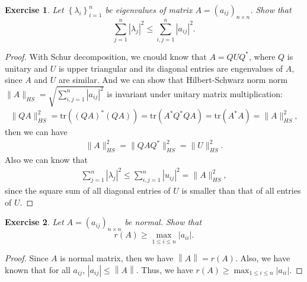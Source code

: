 \documentclass[10pt]{book}
\newtheorem{exercise}{Exercise}[section]
\theoremstyle{definition}
\numberwithin{equation}{chapter}
\begin{document}
\medskip

\begin{exercise}
Let $\left\{  \lambda_{i}\right\}  _{i=1}^{n}$ be eigenvalues of matrix
$A=\left(  a_{ij}\right)  _{n\times n}$. Show that%
$$
\sum_{j=1}^{n}\left\vert \lambda_{j}\right\vert ^{2}\leq\sum_{i,j=1}%
^{n}\left\vert a_{ij}\right\vert ^{2}.
$$
\end{exercise}
\begin{proof}
With Schur decomposition, we cnould know that $A = Q U Q^*$, where $Q$ is unitary and $U$ is upper triangular and its diagonal entries are engenvalues of $A$, since $A$ and $U$ are similar. And we can show that Hilbert-Schwarz norm norm $\|A\|_{HS} = \sqrt{\sum_{i,j=1}^{n} \left|a_{ij}\right|^2}$ is invariant under unitary matrix multiplication:
\begin{align*}
    \|QA\|_{HS}^2 = \text{tr} \left((QA)^* (QA)\right) = \text{tr} \left(A^* Q^* QA\right) = \text{tr} \left(A^* A\right) = \|A\|_{HS}^2,
\end{align*}
then we can have 
\begin{align*}
    \|A\|_{HS}^2 = \|QAQ^*\|_{HS}^2 = \|U\|_{HS}^2.
\end{align*}
Also we can know that
\begin{align*}
    \sum_{j=1}^{n}\left| \lambda_{j}\right|^{2}\leq \sum_{i,j=1}^{n}\left| u_{ij}\right|^{2} = \|A\|_{HS}^2,
\end{align*}
since the square sum of all diagonal entries of $U$ is smaller than that of all entries of $U$.
\end{proof}

\medskip

\begin{exercise}
Let $A=\left(  a_{ij}\right)  _{n\times n}$ be normal. Show that%
$$
r\left(  A\right)  \geq\max_{1\leq i\leq n}\left\vert a_{ii}\right\vert .
$$
\end{exercise}
\begin{proof}
Since $A$ is normal matrix, then we have $\left\|A\right\| = r(A)$. Also, we have known that for all $a_{ij}$, $\left|a_{ij}\right|\leq \left\|A\right\|$. Thus, we have $r(A)\geq \max_{1\leq i\leq n}\left|a_{ii}\right|$.
\end{proof}

\medskip
\end{document}
